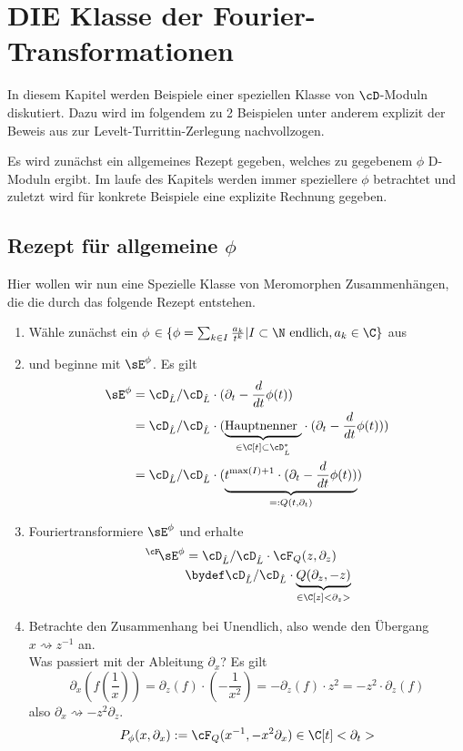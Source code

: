 \chapter{DIE Klasse der Fourier-Transformationen}
In diesem Kapitel werden Beispiele einer speziellen Klasse von $\cD$-Moduln
diskutiert. Dazu wird im folgendem zu 2 Beispielen unter anderem explizit der
Beweis aus \cite{sabbah_cimpa90} zur Levelt-Turrittin-Zerlegung nachvollzogen.

Es wird zunächst ein allgemeines Rezept gegeben, welches zu gegebenem $\phi$
D-Moduln ergibt. Im laufe des Kapitels werden immer speziellere $\phi$
betrachtet und zuletzt wird für konkrete Beispiele eine explizite Rechnung
gegeben.

\section{Rezept für allgemeine $\phi$} \label{sec:allgemeinProblem}
Hier wollen wir nun eine Spezielle Klasse von Meromorphen Zusammenhängen, die
die durch das folgende Rezept entstehen.
\begin{enumerate}
\item Wähle zunächst ein $\phi$
$\in\{\phi=\sum_{k\in I}\frac{a_k}{t^{k}}|I\subset\N\mbox{ endlich}
,a_k\in \C\}$
aus
\item und beginne mit $\sE^{\phi}$. Es gilt
\begin{align*}
\sE^{\phi} &= \cD_{\hat L}/\cD_{\hat L}\cdot (\partial_t-\frac{d}{dt}\phi(t))
\\&=\cD_{\hat L}/\cD_{\hat L}\cdot (\underset{\in\C[t]\subset\cD_{\hat L}^*}
    {\underbrace{\mbox{Hauptnenner }}}
  \cdot (\partial_t-\frac{d}{dt}\phi(t)))
\\&=\cD_{\hat L}/\cD_{\hat L}\cdot ( \underset{=:Q(t,\partial_t)}{\underbrace{
  t^{\max(I)+1} \cdot (\partial_t-\frac{d}{dt}\phi(t))}})
\end{align*}
\begin{comment}
Dies ändert den Meromorphen Zusammenhang nicht, weil $t^{\max(I)+1}$ eine
Einheit in $\cD_{\hat L}$ (und auch in $\cD_{L}$) ist.
\end{comment}
\item Fouriertransformiere $\sE^{\phi}$ und erhalte
\begin{align*}
\,^\cF\!\sE^{\phi}&=\cD_{\hat L}/\cD_{\hat L}\cdot{\cF_Q(z,\partial_z)}
\\&\bydef \cD_{\hat L}/\cD_{\hat L}\cdot
  \underset{\in\C[z]<\partial_z>}{\underbrace{Q(\partial_z,-z)}}
\end{align*}
\item Betrachte den Zusammenhang bei Unendlich, also wende den Übergang
$x\rightsquigarrow z^{-1}$ an.\\
Was passiert mit der Ableitung $\partial_x$?
Es gilt
\[
\partial_x (f(\frac{1}{x}))=
\partial_z(f)\cdot (-\frac{1}{x^2})=
-\partial_z(f)\cdot z^2= %
- z^2 \cdot \partial_z(f)
\]
also $ \partial_x\rightsquigarrow-z^2\partial_z $.
\[
P_\phi(x,\partial_x):=\cF_Q(x^{-1},-x^2\partial_x) \in \C[t]<\partial_t>
\]
\end{enumerate}
